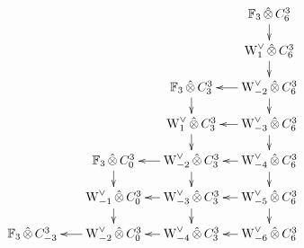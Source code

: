 
\[
	\xymatrix@R=.4cm@C=.4cm{
		\phantom{W_4 \hotimes C^{3}_{-3}} &
		\phantom{W_4 \hotimes C^{3}_{-3}} &
		\phantom{W_4 \hotimes C^{3}_{0}} &
		\phantom{W_4 \hotimes C^{3}_{3}} &
		\bF_3 \hotimes C^{3}_{6}\ar[d]
		\\
		\phantom{W_3 \hotimes C^{3}_{-3}} &
		\phantom{W_3 \hotimes C^{3}_{-3}} &
		\phantom{W_3 \hotimes C^{3}_{0}} &
		\phantom{W_3 \hotimes C^{3}_{3}} &
		\rWd[1] \hotimes C^{3}_{6}\ar[d]
		\\
		\phantom{W_2 \hotimes C^{3}_{-3}} &
		\phantom{W_2 \hotimes C^{3}_{-3}} &
		\phantom{W_2 \hotimes C^{3}_{0}} &
		\bF_3 \hotimes C^{3}_{3}\ar[d] &
		\rWd[-2] \hotimes C^{3}_{6}\ar[d]\ar[l]
		\\
		\phantom{W_1 \hotimes C^{3}_{-3}} &
		\phantom{W_1 \hotimes C^{3}_{-3}}&
		\phantom{W_1 \hotimes C^{3}_{0}} &
		\rWd[1] \hotimes C^{3}_{3}\ar[d] &
		\rWd[-3] \hotimes C^{3}_{6}\ar[d]\ar[l]
		\\
		\phantom{W_0 \hotimes C^{3}_{-3}} &
		\phantom{W_0 \hotimes C^{3}_{-3}}&
		\bF_3 \hotimes C^{3}_{0}\ar[d] &
		\rWd[-2] \hotimes C^{3}_{3}\ar[d]\ar[l] &
		\rWd[-4] \hotimes C^{3}_{6}\ar[d]\ar[l]
		\\
		\phantom{\rWd[-1] \hotimes C^{3}_{-3}} &
		\phantom{\rWd[-1] \hotimes C^{3}_{-3}} &
		\rWd[-1] \hotimes C^{3}_{0}\ar[d] &
		\rWd[-3] \hotimes C^{3}_{3}\ar[d]\ar[l] &
		\rWd[-5] \hotimes C^{3}_{6}\ar[d]\ar[l]
		\\
		\phantom{\rWd[-2] \hotimes C^{3}_{-3}} &
		\bF_3 \hotimes C^{3}_{-3} &
		\rWd[-2] \hotimes C^{3}_{0}\ar[l] &
		\rWd[-4] \hotimes C^{3}_{3}\ar[l] &
		\rWd[-6] \hotimes C^{3}_{6}\ar[l]
}
\]
